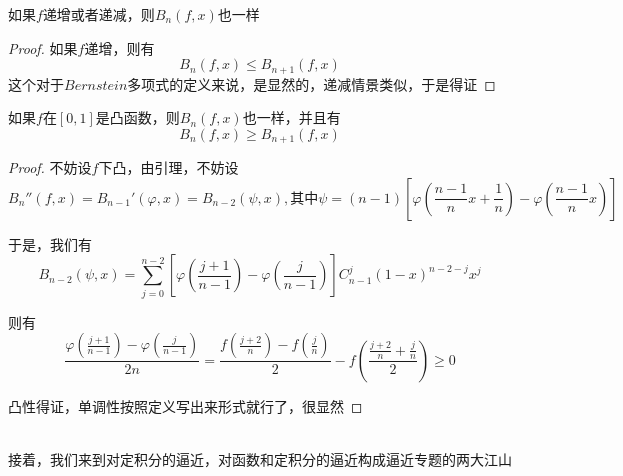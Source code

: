 \documentclass[lang=cn,10pt]{elegantbook}
\begin{document}
		\begin{theorem}
		如果$f$递增或者递减，则$B_n\left( f,x \right)$也一样
	\end{theorem}
	\begin{proof}
		如果$f$递增，则有
		\begin{equation*}
			B_{
				n}\left( f,x \right)\le B_{
				n+1}\left( f,x \right)
		\end{equation*}
		这个对于$Bernstein$多项式的定义来说，是显然的，递减情景类似，于是得证
	\end{proof}
	\begin{theorem}
		如果$f$在$[0,1]$是凸函数，则$B_n\left( f,x \right)$也一样，并且有
		\begin{equation*}
			B_{
				n}\left( f,x \right)\ge B_{
				n+1}\left( f,x \right)
		\end{equation*}
	\end{theorem}
	\begin{proof}
		
		不妨设$f$下凸，由引理，不妨设
		\begin{equation*}
			B_{n}''\left( f,x \right) =B_{n-1}'\left( \varphi ,x \right) =B_{n-2}\left( \psi ,x \right) ,\text{其中}\psi =\left( n-1 \right) \left[ \varphi \left( \frac{n-1}{n}x+\frac{1}{n} \right) -\varphi \left( \frac{n-1}{n}x \right) \right] 
		\end{equation*}
		
		于是，我们有
		\begin{equation*}
			B_{n-2}\left( \psi ,x \right) =\sum_{j=0}^{n-2}{\left[ \varphi \left( \frac{j+1}{n-1} \right) -\varphi \left( \frac{j}{n-1} \right) \right]}C_{n-1}^{j}\left( 1-x \right) ^{n-2-j}x^j
		\end{equation*}
		
		则有
		\begin{equation*}
			\frac{\varphi \left( \frac{j+1}{n-1} \right) -\varphi \left( \frac{j}{n-1} \right)}{2n}=\frac{f\left( \frac{j+2}{n} \right) -f\left( \frac{j}{n} \right)}{2}-f\left( \frac{\frac{j+2}{n}+\frac{j}{n}}{2} \right) \ge 0
		\end{equation*}
		
		凸性得证，单调性按照定义写出来形式就行了，很显然
	\end{proof}
	
	~\\
	
	接着，我们来到对定积分的逼近，对函数和定积分的逼近构成逼近专题的两大江山
	
\end{document}
